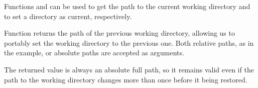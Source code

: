 \documentclass[krantz2,ChapterTOCs]{krantz}\usepackage{knitr}
\begin{document}
Functions  and  can be used to get the path to the current working directory and to set a directory as current, respectively.
\begin{knitrout}\footnotesize
{}\color{fgcolor}\begin{kframe}
\begin{alltt}
\hlstd{()}
\end{alltt}
\end{kframe}
\end{knitrout}

Function  returns the path of the previous working directory, allowing us to portably set the working directory to the previous one. Both relative paths, as in the example, or absolute paths are accepted as arguments.
\begin{knitrout}\footnotesize
{}\color{fgcolor}\begin{kframe}
\begin{alltt}
 \hlkwb{<-} \hlstd{(}\hlstd{)}
\hlstd{()}
\end{alltt}
\end{kframe}
\end{knitrout}

The returned value is always an absolute full path, so it remains valid even if the path to the working directory changes more than once before it being restored.
\begin{knitrout}\footnotesize
{}\color{fgcolor}\begin{kframe}
\begin{alltt}
\hlstd{()}
\end{alltt}
\end{kframe}
\end{knitrout}
\end{document}
